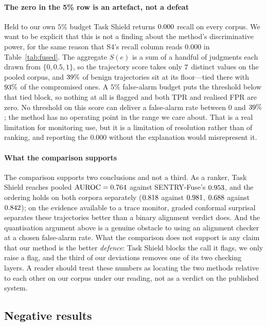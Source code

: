\documentclass[pdflatex,sn-basic]{sn-jnl}%
\theoremstyle{thmstyleone}
\theoremstyle{thmstyletwo}
\theoremstyle{thmstylethree}
\begin{document}
\paragraph{The zero in the 5\% row is an artefact, not a defeat} Held to our own
$5\%$ budget Task Shield returns $0.000$ recall on every corpus. We want to be
explicit that this is not a finding about the method's discriminative power, for
the same reason that S4's recall column reads $0.000$ in
Table~\ref{tab:fused}. The aggregate $S(e)$ is a sum of a handful of judgments each
drawn from $\{0, 0.5, 1\}$, so the trajectory score takes only $7$
distinct values on the pooled corpus, and $39\%$ of benign
trajectories sit at its floor---tied there with $93\%$ of the
compromised ones. A $5\%$ false-alarm budget puts the threshold below that tied
block, so nothing at all is flagged and both TPR and realised FPR are zero. No
threshold on this score can deliver a false-alarm rate between $0$ and
$39\%$; the method has no operating point in the range we care
about. That is a real limitation for monitoring use, but it is a limitation of
resolution rather than of ranking, and reporting the $0.000$ without the
explanation would misrepresent it.

\paragraph{What the comparison supports} The comparison supports two conclusions
and not a third. As a ranker, Task Shield reaches pooled $\mathrm{AUROC} = 0.764$ against SENTRY-Fuse's
$0.953$, and the ordering holds on both corpora separately
($0.818$ against $0.981$, $0.688$ against $0.842$); on
the evidence available to a trace monitor, graded conformal surprisal separates
these trajectories better than a binary alignment verdict does. And the
quantisation argument above is a genuine obstacle to using an alignment checker at
a chosen false-alarm rate. What the comparison does not support is any
claim that our method is the better \emph{defence}: Task Shield blocks the call it
flags, we only raise a flag, and the third of our deviations removes one of its two
checking layers. A reader should treat these numbers as locating the two methods
relative to each other on our corpus under our reading, not as a verdict on the
published system.


\subsection{Negative results}\label{sec:negatives}
\end{document}
